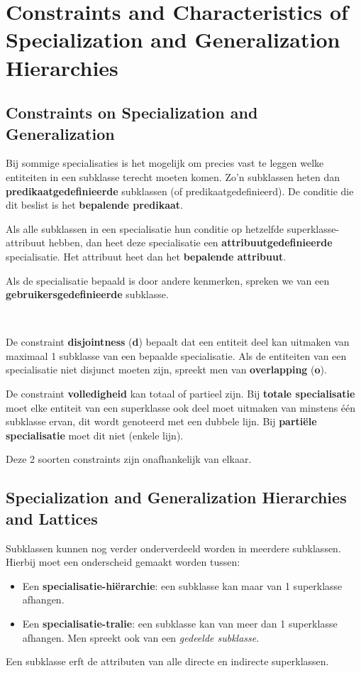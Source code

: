 \section{Constraints and Characteristics of Specialization and Generalization Hierarchies}
\subsection{Constraints on Specialization and Generalization}
Bij sommige specialisaties is het mogelijk om precies vast te leggen welke entiteiten in een subklasse terecht moeten komen. Zo'n subklassen heten dan \textbf{predikaatgedefinieerde} subklassen (of predikaatgedefinieerd). De conditie die dit beslist is het \textbf{bepalende predikaat}.

Als alle subklassen in een specialisatie hun conditie op hetzelfde superklasse-attribuut hebben, dan heet deze specialisatie een \textbf{attribuutgedefinieerde} specialisatie. Het attribuut heet dan het \textbf{bepalende attribuut}.

Als de specialisatie bepaald is door andere kenmerken, spreken we van een \textbf{gebruikersgedefinieerde} subklasse.

~

\noindent De constraint \textbf{disjointness} (\textbf{d}) bepaalt dat een entiteit deel kan uitmaken van maximaal 1 subklasse van een bepaalde specialisatie. Als de entiteiten van een specialisatie niet disjunct moeten zijn, spreekt men van \textbf{overlapping} (\textbf{o}).

De constraint \textbf{volledigheid} kan totaal of partieel zijn. Bij \textbf{totale specialisatie} moet elke entiteit van een superklasse ook deel moet uitmaken van minstens \'e\'en subklasse ervan, dit wordt genoteerd met een dubbele lijn. Bij \textbf{parti\"ele specialisatie} moet dit niet (enkele lijn).

Deze 2 soorten constraints zijn onafhankelijk van elkaar.

\subsection{Specialization and Generalization Hierarchies and Lattices}
Subklassen kunnen nog verder onderverdeeld worden in meerdere subklassen. Hierbij moet een onderscheid gemaakt worden tussen:
\begin{itemize}
\item Een \textbf{specialisatie-hi\"erarchie}: een subklasse kan maar van 1 superklasse afhangen.
\item Een \textbf{specialisatie-tralie}: een subklasse kan van meer dan 1 superklasse afhangen. Men spreekt ook van een \textit{gedeelde subklasse}.
\end{itemize}
Een subklasse erft de attributen van alle directe en indirecte superklassen.

